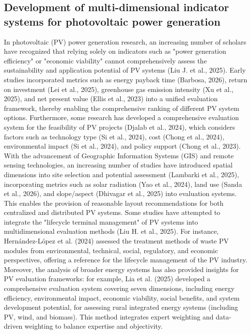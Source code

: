 \documentclass{article}
\begin{document}
	\subsection{Development of multi-dimensional indicator systems for photovoltaic power generation}
	In photovoltaic (PV) power generation research, an increasing number of scholars have recognized that relying solely on indicators such as "power generation efficiency" or "economic viability" cannot comprehensively assess the sustainability and application potential of PV systems (Liu J. et al., 2025). Early studies incorporated metrics such as energy payback time (Barbosa, 2026), return on investment (Lei et al., 2025), greenhouse gas emission intensity (Xu et al., 2025), and net present value (Ellis et al., 2023) into a unified evaluation framework, thereby enabling the comprehensive ranking of different PV system options. Furthermore, some research has developed a comprehensive evaluation system for the feasibility of PV projects (Djalab et al., 2024), which considers factors such as technology type (Si et al., 2024), cost (Chong et al., 2024), environmental impact (Si et al., 2024), and policy support (Chong et al., 2023). With the advancement of Geographic Information Systems (GIS) and remote sensing technologies, an increasing number of studies have introduced spatial dimensions into site selection and potential assessment (Lambarki et al., 2025), incorporating metrics such as solar radiation (Yao et al., 2024), land use (Sanda et al., 2026), and slope/aspect (Dhivagar et al., 2025) into evaluation systems. This enables the provision of reasonable layout recommendations for both centralized and distributed PV systems. Some studies have attempted to integrate the "lifecycle terminal management" of PV systems into multidimensional evaluation methods (Liu H. et al., 2025). For instance, Hernández-López et al. (2024) assessed the treatment methods of waste PV modules from environmental, technical, social, regulatory, and economic perspectives, offering a reference for the lifecycle management of the PV industry. Moreover, the analysis of broader energy systems has also provided insights for PV evaluation frameworks: for example, Lia et al. (2025) developed a comprehensive evaluation system covering seven dimensions, including energy efficiency, environmental impact, economic viability, social benefits, and system development potential, for assessing rural integrated energy systems (including PV, wind, and biomass). This method integrates expert weighting and data-driven weighting to balance expertise and objectivity.
	
\end{document}
